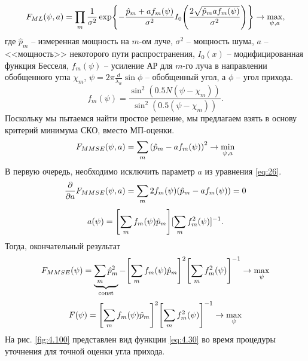 \begin{equation}
    F_{ML}(\psi, a) = \prod\limits_m \frac{1}{\sigma^2}
    \exp{-\frac{\hat p_m + a f_m(\psi)}{\sigma^2}
        I_0\qty(\frac{2\sqrt{\hat p_m a f_m(\psi)}}{\sigma^2})} \to \max_{\psi, a},
\end{equation}
где $\hat p_m$ -- измеренная мощность на $m$-ом луче, $\sigma^2$ -- мощность
шума, $a$ -- <<мощность>> некоторого пути распространения, $I_0(x)$ --
модифицированная функция Бесселя, $f_m(\psi)$ -- усиление АР для $m$-го луча в
направлении обобщенного угла $\chi_m$, $\psi = 2\pi \frac{d}{\lambda_w}\sin
    \phi$ -- обобщенный угол, а $\phi$ -- угол прихода.
\begin{equation}
    f_m(\psi) = \frac{\sin^2 (0.5N(\psi - \chi_m))}{\sin^2(0.5(\psi - \chi_m))}.
\end{equation}
Поскольку мы пытаемся найти простое решение, мы предлагаем взять в основу
критерий минимума СКО, вместо МП-оценки.
\begin{equation}
    \label{eq:26}
    F_{MMSE}(\psi, a) = \sum\limits_m \qty(\hat p_m - a f_m(\psi))^2 \to \min_{\psi,a}
\end{equation}
В первую очередь, необходимо исключить параметр $a$ из уравнения \eqref{eq:26}.
\begin{equation}
    \pdv{a} F_{MMSE}(\psi, a) = \sum\limits_m 2f_m(\psi) (\hat p_m - a f_m(\psi)) = 0
\end{equation}
\begin{equation}
    a(\psi) = \qty[\sum\limits_m f_m(\psi) \hat p_m][\sum\limits_m f_m^2(\psi)]^{-1}.
\end{equation}
Тогда, окончательный результат
\begin{equation}
    F_{MMSE}(\psi)=\underbrace{\sum\limits_m \hat p_m^2}_{\text{const}} - \qty[\sum\limits_m f_m(\psi) \hat p_m]^2 \qty[\sum \limits_m f_m^2 (\psi)]^{-1} \to \max_{\psi}
\end{equation}
\begin{equation}
    \label{eq:4.30}
    F(\psi)=\qty[\sum\limits_m f_m(\psi) \hat p_m]^2 \qty[\sum \limits_m f_m^2 (\psi)]^{-1} \to \max_{\psi}
\end{equation}
На рис. \ref{fig:4.100} представлен вид функции \eqref{eq:4.30} во время процедуры уточнения для точной оценки угла прихода.

